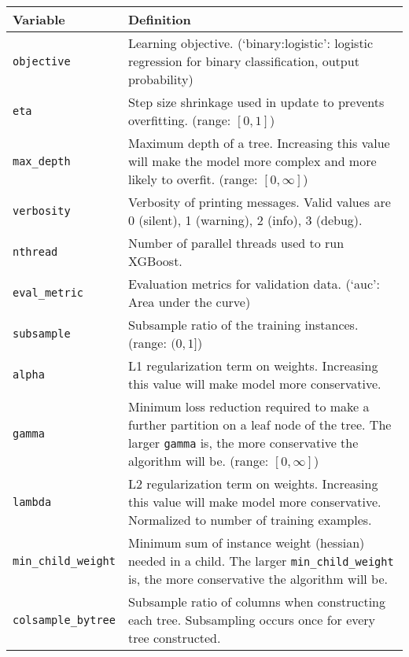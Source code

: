 \begin{tabular}{p{.25\linewidth} p{.75\linewidth}}
\toprule
Variable & Definition \\
\midrule
\verb|objective| & Learning objective. (`binary:logistic': logistic regression for binary classification, output probability) \\
\verb|eta| & Step size shrinkage used in update to prevents overfitting. (range: $[0,1]$) \\
\verb|max_depth| & Maximum depth of a tree. Increasing this value will make the model more complex and more likely to overfit. (range: $[0,\infty]$) \\
\verb|verbosity| & Verbosity of printing messages. Valid values are 0 (silent), 1 (warning), 2 (info), 3 (debug). \\
\verb|nthread| & Number of parallel threads used to run XGBoost. \\
\verb|eval_metric| & Evaluation metrics for validation data. (`auc': Area under the curve) \\
\verb|subsample| & Subsample ratio of the training instances. (range: $(0,1]$) \\
\verb|alpha| & L1 regularization term on weights. Increasing this value will make model more conservative. \\
\verb|gamma| & Minimum loss reduction required to make a further partition on a leaf node of the tree. The larger \verb|gamma| is, the more conservative the algorithm will be. (range: $[0,\infty]$) \\
\verb|lambda| & L2 regularization term on weights. Increasing this value will make model more conservative. Normalized to number of training examples. \\
\verb|min_child_weight| & Minimum sum of instance weight (hessian) needed in a child. The larger \verb|min_child_weight| is, the more conservative the algorithm will be. \\
\verb|colsample_bytree| & Subsample ratio of columns when constructing each tree. Subsampling occurs once for every tree constructed. \\
\bottomrule
\end{tabular}
